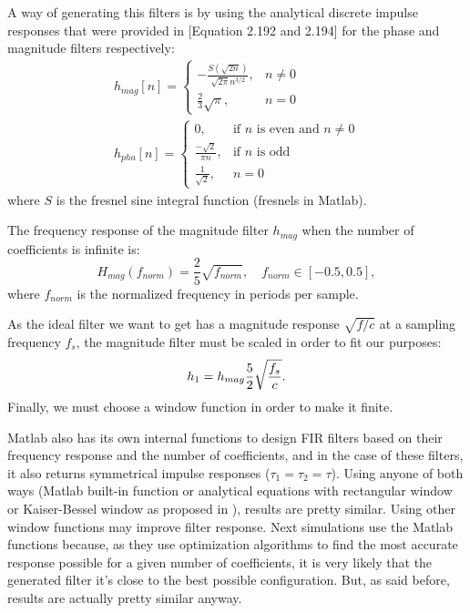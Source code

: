 A way of generating this filters is by using the analytical discrete impulse responses that were provided in \cite{FrankSchutz2015}[Equation 2.192 and 2.194] for the phase and magnitude filters respectively:
\begin{gather}
	{h_{mag}}[n] = \begin{cases}
		-\frac{S(\sqrt{2n})}{\sqrt{2\pi}n^{3/2}}, & n \neq 0 \\
		\frac{2}{3}\sqrt{\pi}, & n = 0
	\end{cases} \\
	{h_{pha}}[n] = \begin{cases}
		0, & \text{if $n$ is even and $n \neq 0$} \\
		\frac{-\sqrt{2}}{\pi n}, & \text{if $n$ is odd} \\
		\frac{1}{\sqrt{2}}, & n = 0
	\end{cases}
\end{gather}
where $S$ is the fresnel sine integral function (fresnels in Matlab).

The frequency response of the magnitude filter $h_{mag}$ when the number of coefficients is infinite is:
\begin{equation}
H_{mag}(f_{norm}) = \frac{2}{5}\sqrt{f_{norm}}, \quad f_{norm} \in [-0.5, 0.5],
\end{equation}
where $f_{norm}$ is the normalized frequency in periods per sample.

As the ideal filter we want to get has a magnitude response $\sqrt{f/c}$ at a sampling frequency $f_s$, the magnitude filter must be scaled in order to fit our purposes:
\begin{equation}
\freqFilter[time][magnitude] = h_{mag}\frac{5}{2}\sqrt{\frac{f_s}{c}}. %
\end{equation}
Finally, we must choose a window function in order to make it finite.

Matlab also has its own internal functions to design FIR filters based on their frequency response and the number of coefficients, and in the case of these filters, it also returns symmetrical impulse responses ($\tau_1 = \tau_2 = \tau$). Using anyone of both ways (Matlab built-in function or analytical equations with rectangular window or Kaiser-Bessel window as proposed in \cite{FrankSchutz2015}), results are pretty similar. Using other window functions may improve filter response. Next simulations use the Matlab functions because, as they use optimization algorithms to find the most accurate response possible for a given number of coefficients, it is very likely that the generated filter it's close to the best possible configuration. But, as said before, results are actually pretty similar anyway.

